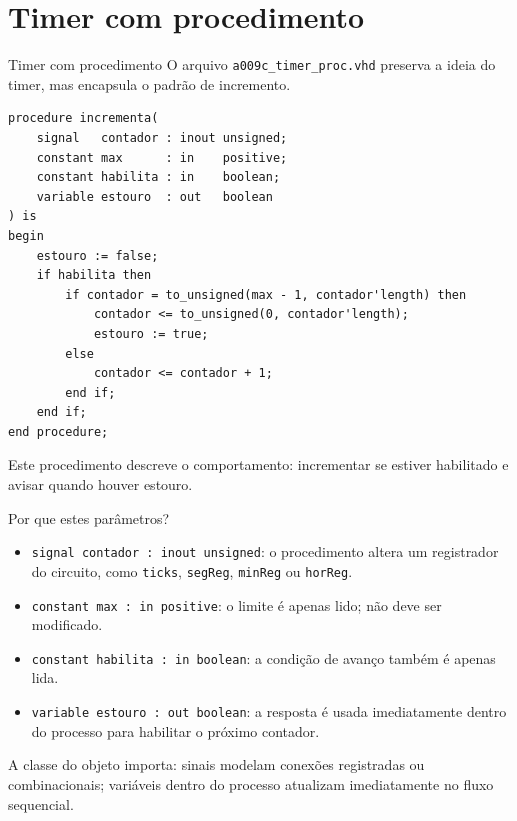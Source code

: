 \documentclass[aspectratio=169,11pt]{beamer}
\begin{document}
\section{Timer com procedimento}

\begin{frame}[fragile]{Timer com procedimento}
    O arquivo \texttt{a009c\_timer\_proc.vhd} preserva a ideia do timer, mas encapsula o padrão de incremento.

\begin{lstlisting}
procedure incrementa(
    signal   contador : inout unsigned;
    constant max      : in    positive;
    constant habilita : in    boolean;
    variable estouro  : out   boolean
) is
begin
    estouro := false;
    if habilita then
        if contador = to_unsigned(max - 1, contador'length) then
            contador <= to_unsigned(0, contador'length);
            estouro := true;
        else
            contador <= contador + 1;
        end if;
    end if;
end procedure;
\end{lstlisting}

    \vspace{0.3em}
    Este procedimento descreve o comportamento: incrementar se estiver habilitado e avisar quando houver estouro.
\end{frame}

\begin{frame}{Por que estes parâmetros?}
    \begin{itemize}
        \item \texttt{signal contador : inout unsigned}: o procedimento altera um registrador do circuito, como \texttt{ticks}, \texttt{segReg}, \texttt{minReg} ou \texttt{horReg}.
        \item \texttt{constant max : in positive}: o limite é apenas lido; não deve ser modificado.
        \item \texttt{constant habilita : in boolean}: a condição de avanço também é apenas lida.
        \item \texttt{variable estouro : out boolean}: a resposta é usada imediatamente dentro do processo para habilitar o próximo contador.
    \end{itemize}

    \vspace{0.5em}
    A classe do objeto importa: sinais modelam conexões registradas ou combinacionais; variáveis dentro do processo atualizam imediatamente no fluxo sequencial.
\end{frame}
\end{document}
